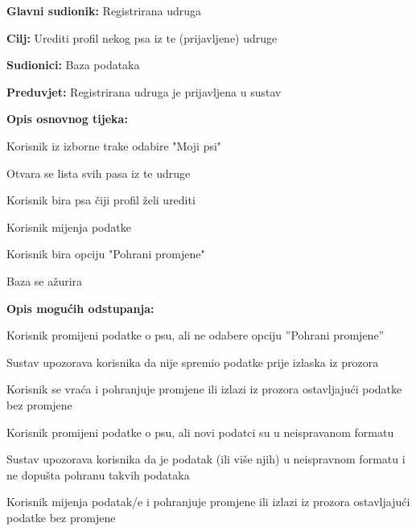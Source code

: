 		
				\noindent {}
			\begin{packed_item}
				
				\item \textbf{Glavni sudionik:} Registrirana udruga
				\item  \textbf{Cilj:} Urediti profil nekog psa iz te (prijavljene) udruge
				\item  \textbf{Sudionici:} Baza podataka
				\item  \textbf{Preduvjet:} Registrirana udruga je prijavljena u sustav
				\item  \textbf{Opis osnovnog tijeka:}
				
				\item[] \begin{packed_enum}
					\item Korisnik iz izborne trake odabire "Moji psi"
					\item Otvara se lista svih pasa iz te udruge
					\item Korisnik bira psa čiji profil želi urediti
					\item Korisnik mijenja podatke 
					\item Korisnik bira opciju "Pohrani promjene"
					\item Baza se ažurira
				\end{packed_enum}
				
				\item  \textbf{Opis mogućih odstupanja:}
				
				\item[] \begin{packed_item}
					
					\item [4.a]  Korisnik promijeni podatke o psu, ali ne odabere opciju ”Pohrani
					promjene”
					\item[] \begin{packed_enum}
						
						\item Sustav upozorava korisnika da nije spremio podatke prije izlaska iz prozora
						\item Korisnik se vraća i pohranjuje promjene ili izlazi iz prozora ostavljajući podatke bez promjene
					\end{packed_enum}
					
					\item [4.b]  Korisnik promijeni podatke o psu, ali novi podatci su u neispravanom formatu
					\item[] \begin{packed_enum}
						
						\item Sustav upozorava korisnika da je podatak (ili više njih) u neispravnom formatu i ne dopušta pohranu takvih podataka
						\item Korisnik mijenja podatak/e i pohranjuje promjene ili izlazi iz prozora ostavljajući podatke bez promjene
					\end{packed_enum}
				\end{packed_item}
			\end{packed_item}
		
